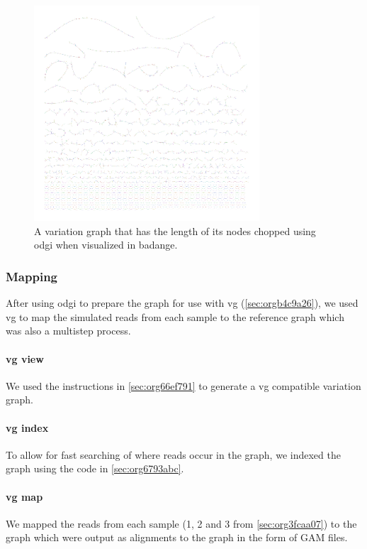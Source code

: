 \documentclass[10pt, a4paper]{article}
\begin{document}
\begin{figure}[h]
\centering
\includegraphics[width=0.75\textwidth]{../Figures/SARS_CoV_2/SARS_Variation_Graph.png}
\caption[SARS-CoV-2 Variation Graph]{\label{fig:org7bc9041}A variation graph that has the length of its nodes chopped using odgi when visualized in badange.}
\end{figure}

\subsubsection{Mapping}
\label{sec:org10e24d9}
After using odgi to prepare the graph for use with vg
(\ref{sec:orgb4c9a26}), we used vg to map the simulated reads from
each sample to the reference graph which was also a multistep process.

\paragraph{vg view}
\label{sec:org26e57d7}
We used the instructions in \ref{sec:org66ef791} to generate a vg
\cite{garrisonVariationGraphToolkit2018} compatible variation graph. 

\paragraph{vg index}
\label{sec:org8a4939c}
To allow for fast searching of where reads occur in the graph, we indexed the 
graph using the code in \ref{sec:org6793abc}.

\paragraph{vg map}
\label{sec:org0dc4fbd}
We mapped the reads from each sample (1, 2 and 3 from \ref{sec:org3fcaa07}) to the 
graph which were output as alignments to the graph in the form of GAM files. 
\end{document}

